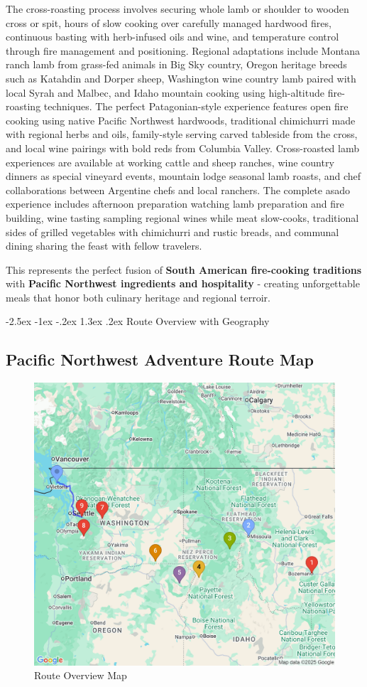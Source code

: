 \documentclass[
  11pt,
  letterpaper,
  DIV=10,
  numbers=noendperiod]{scrartcl}
\makeatletter
\renewcommand{\section}{\@startsection{section}{1}{\z@}%
  {-2.5ex \@plus -1ex \@minus -.2ex}%
  {1.3ex \@plus .2ex}%
  {\normalfont\fontsize{16}{19}\bfseries\color{twinpeaksred}}}
\makeatother
\begin{document}
The cross-roasting process involves securing whole lamb or shoulder to
wooden cross or spit, hours of slow cooking over carefully managed
hardwood fires, continuous basting with herb-infused oils and wine, and
temperature control through fire management and positioning. Regional
adaptations include Montana ranch lamb from grass-fed animals in Big Sky
country, Oregon heritage breeds such as Katahdin and Dorper sheep,
Washington wine country lamb paired with local Syrah and Malbec, and
Idaho mountain cooking using high-altitude fire-roasting techniques. The
perfect Patagonian-style experience features open fire cooking using
native Pacific Northwest hardwoods, traditional chimichurri made with
regional herbs and oils, family-style serving carved tableside from the
cross, and local wine pairings with bold reds from Columbia Valley.
Cross-roasted lamb experiences are available at working cattle and sheep
ranches, wine country dinners as special vineyard events, mountain lodge
seasonal lamb roasts, and chef collaborations between Argentine chefs
and local ranchers. The complete asado experience includes afternoon
preparation watching lamb preparation and fire building, wine tasting
sampling regional wines while meat slow-cooks, traditional sides of
grilled vegetables with chimichurri and rustic breads, and communal
dining sharing the feast with fellow travelers.

This represents the perfect fusion of \textbf{South American
fire-cooking traditions} with \textbf{Pacific Northwest ingredients and
hospitality} - creating unforgettable meals that honor both culinary
heritage and regional terroir.

\newpage

\section{Route Overview with
Geography}\label{route-overview-with-geography}

\subsection{Pacific Northwest Adventure Route
Map}\label{pacific-northwest-adventure-route-map}

\begin{figure}[H]

{\centering \includegraphics[width=0.5\linewidth,height=\textheight,keepaspectratio]{images/route_overview_map.png}

}

\caption{Route Overview Map}

\end{figure}%
\end{document}
